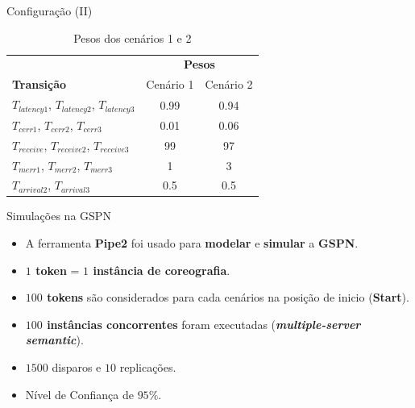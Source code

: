\documentclass[xcolor=svgnames]{beamer}
\newcommand {\otoprule}{\midrule [\heavyrulewidth]}  %
\begin{document}
  \begin{frame}{ Configuração (II) }
        \begin{table}[!h]
            \centering
            \caption{Pesos dos cenários 1 e 2}
            \label{table:transitionsConfigurations}
            \begin{tabular}{ lcc}
	      \toprule	
        		    &   \multicolumn{2}{c}{ \textbf{Pesos} } \\
	      \cmidrule(r){2-3}
              \textbf{Transição}      		&      Cenário 1   &   Cenário 2 		\\
	      \otoprule
               $T_{latency1}$, $T_{latency2}$, $T_{latency3}$ 	& 	0.99       &   0.94	\\
               $T_{cerr1}$, $T_{cerr2}$, $T_{cerr3}$      	&  	0.01 	   &   0.06	\\
               $T_{receive}$, $T_{receive2}$, $T_{receive3}$  &  	99  	   &    97	\\
               $T_{merr1}$, $T_{merr2}$, $T_{merr3}$   &   1 	   &    3	\\
               $T_{arrival2}$, $T_{arrival3}$   &  0.5  &	0.5	\\
              \bottomrule
            \end{tabular}
        \end{table}

  \end{frame}


    \begin{frame}{ Simulações na GSPN }
      \begin{itemize}
	\item <1-> A ferramenta \textbf{Pipe2} foi usado para \textbf{modelar} e \textbf{simular} a \textbf{GSPN}.
	\item <2-> \textbf{$1$ token} = \textbf{$1$ instância de coreografia}.
	\item <2-> \textbf{$100$ tokens} são considerados para cada cenários na posição de inicio (\textbf{Start}).
	\item <2-> \textbf{$100$ instâncias concorrentes} foram executadas (\textbf{\textit{multiple-server semantic}}).
	\item <3-> $1500$ disparos e $10$ replicações.
	\item <3-> Nível de Confiança de $95\%$.
      \end{itemize}
    \end{frame}
\end{document}
